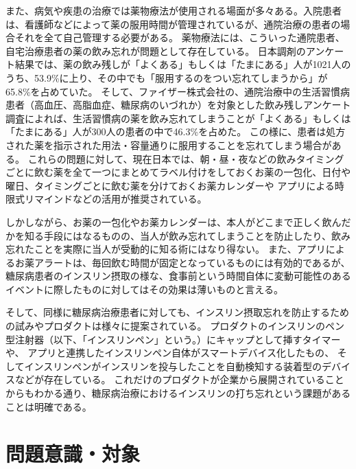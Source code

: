 また、病気や疾患の治療では薬物療法が使用される場面が多々ある。入院患者は、看護師などによって薬の服用時間が管理されているが、通院治療の患者の場合それを全て自己管理する必要がある。
薬物療法には、こういった通院患者、自宅治療患者の薬の飲み忘れが問題として存在している。\cite{hokkaido_mc_forget_medicine} \cite{drug_treatment_investigation} \cite{jp_mc_forget_medicine}
日本調剤のアンケート結果では、薬の飲み残しが「よくある」もしくは「たまにある」人が1021人のうち、53.9\%に上り、その中でも「服用するのをつい忘れてしまうから」が65.8\%を占めていた。\cite{jp_mc_forget_medicine}
そして、ファイザー株式会社の、通院治療中の生活習慣病患者（高血圧、高脂血症、糖尿病のいづれか）を対象とした飲み残しアンケート調査によれば、生活習慣病の薬を飲み忘れてしまうことが「よくある」もしくは「たまにある」人が300人の患者の中で46.3\%を占めた。
この様に、患者は処方された薬を指示された用法・容量通りに服用することを忘れてしまう場合がある。
これらの問題に対して、現在日本では、朝・昼・夜などの飲みタイミングごとに飲む薬を全て一つにまとめてラベル付けをしておくお薬の一包化、日付や曜日、タイミングごとに飲む薬を分けておくお薬カレンダーや
アプリによる時限式リマインドなどの活用が推奨されている。\cite{jp_mc_countermeasure}

しかしながら、お薬の一包化やお薬カレンダーは、本人がどこまで正しく飲んだかを知る手段にはなるものの、当人が飲み忘れてしまうことを防止したり、飲み忘れたことを実際に当人が受動的に知る術にはなり得ない。
また、アプリによるお薬アラートは、毎回飲む時間が固定となっているものには有効的であるが、糖尿病患者のインスリン摂取の様な、食事前という時間自体に変動可能性のあるイベントに際したものに対してはその効果は薄いものと言える。

そして、同様に糖尿病治療患者に対しても、インスリン摂取忘れを防止するための試みやプロダクトは様々に提案されている。
プロダクトのインスリンのペン型注射器（以下、「インスリンペン」という。）にキャップとして挿すタイマー\cite{timesulin}や、
アプリと連携したインスリンペン自体がスマートデバイス化したもの\cite{inpen}、
そしてインスリンペンがインスリンを投与したことを自動検知する装着型のデバイス\cite{insulcheck}などが存在している。
これだけのプロダクトが企業から展開されていることからもわかる通り、糖尿病治療におけるインスリンの打ち忘れという課題があることは明確である。

\section{問題意識・対象}

